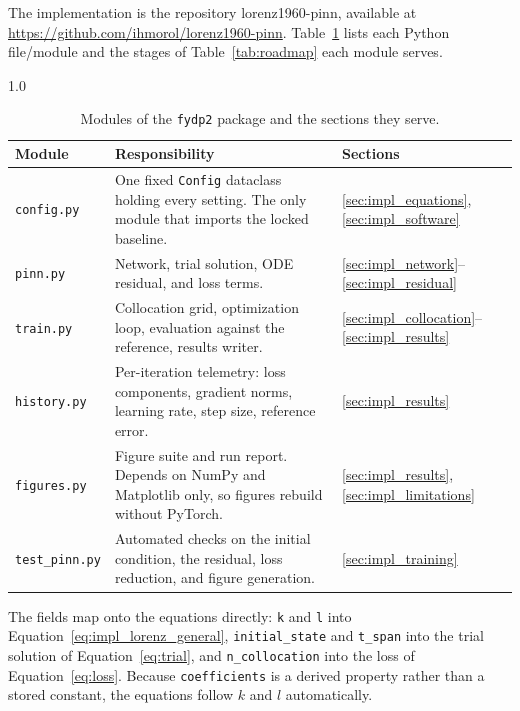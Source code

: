 The implementation is the repository lorenz1960-pinn, available at \url{https://github.com/ihmorol/lorenz1960-pinn}. 
 Table~\ref{tab:modules} lists each Python file/module and the stages of Table~\ref{tab:roadmap} each module serves. 

\begin{table}[H]
\centering
\caption{Modules of the \texttt{fydp2} package and the sections they serve.}
\label{tab:modules}
\begin{spacing}{1.0}
\small
\begin{tabularx}{\textwidth}{|p{2.3cm}|>{\raggedright\arraybackslash}X|p{2.0cm}|}
\hline
\textbf{Module} & \textbf{Responsibility} & \textbf{Sections} \\
\hline
\texttt{config.py} & One fixed \texttt{Config} dataclass holding every setting. The only module that imports the locked baseline. & \ref{sec:impl_equations}, \ref{sec:impl_software} \\
\hline
\texttt{pinn.py} & Network, trial solution, ODE residual, and loss terms. & \ref{sec:impl_network}--\ref{sec:impl_residual} \\
\hline
\texttt{train.py} & Collocation grid, optimization loop, evaluation against the reference, results writer. & \ref{sec:impl_collocation}--\ref{sec:impl_results} \\
\hline
\texttt{history.py} & Per-iteration telemetry: loss components, gradient norms, learning rate, step size, reference error. & \ref{sec:impl_results} \\
\hline
\texttt{figures.py} & Figure suite and run report. Depends on NumPy and Matplotlib only, so figures rebuild without PyTorch. & \ref{sec:impl_results}, \ref{sec:impl_limitations} \\
\hline
\texttt{test\_pinn.py} & Automated checks on the initial condition, the residual, loss reduction, and figure generation. & \ref{sec:impl_training} \\
\hline
\end{tabularx}
\end{spacing}
\end{table}

The fields map onto the equations directly: \texttt{k} and \texttt{l} into Equation~\ref{eq:impl_lorenz_general}, \texttt{initial\_state} and \texttt{t\_span} into the trial solution of Equation~\ref{eq:trial}, and \texttt{n\_collocation} into the loss of Equation~\ref{eq:loss}. Because \texttt{coefficients} is a derived property rather than a stored constant, the equations follow $k$ and $l$ automatically.



